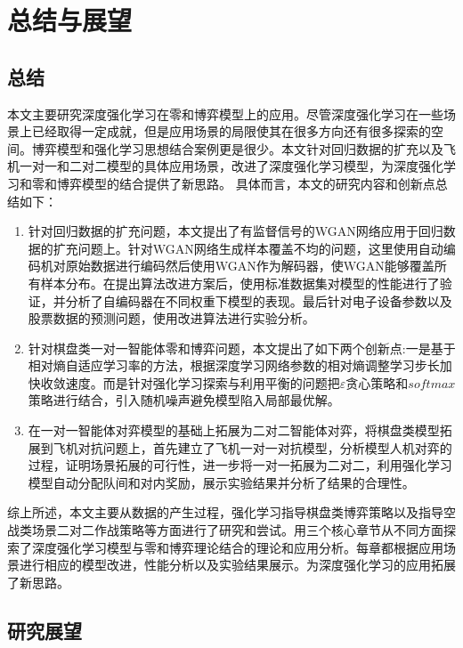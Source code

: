 \chapter{总结与展望}
\section{总结}
本文主要研究深度强化学习在零和博弈模型上的应用。尽管深度强化学习在一些场景上已经取得一定成就，但是应用场景的局限使其在很多方向还有很多探索的空间。博弈模型和强化学习思想结合案例更是很少。本文针对回归数据的扩充以及飞机一对一和二对二模型的具体应用场景，改进了深度强化学习模型，为深度强化学习和零和博弈模型的结合提供了新思路。
具体而言，本文的研究内容和创新点总结如下：
\begin{enumerate}
	\item  针对回归数据的扩充问题，本文提出了有监督信号的WGAN网络应用于回归数据的扩充问题上。针对WGAN网络生成样本覆盖不均的问题，这里使用自动编码机对原始数据进行编码然后使用WGAN作为解码器，使WGAN能够覆盖所有样本分布。在提出算法改进方案后，使用标准数据集对模型的性能进行了验证，并分析了自编码器在不同权重下模型的表现。最后针对电子设备参数以及股票数据的预测问题，使用改进算法进行实验分析。
	\item 针对棋盘类一对一智能体零和博弈问题，本文提出了如下两个创新点:一是基于相对熵自适应学习率的方法，根据深度学习网络参数的相对熵调整学习步长加快收敛速度。而是针对强化学习探索与利用平衡的问题把$\varepsilon$贪心策略和$softmax$策略进行结合，引入随机噪声避免模型陷入局部最优解。
	\item 在一对一智能体对弈模型的基础上拓展为二对二智能体对弈，将棋盘类模型拓展到飞机对抗问题上，首先建立了飞机一对一对抗模型，分析模型人机对弈的过程，证明场景拓展的可行性，进一步将一对一拓展为二对二，利用强化学习模型自动分配队间和对内奖励，展示实验结果并分析了结果的合理性。
\end{enumerate}

综上所述，本文主要从数据的产生过程，强化学习指导棋盘类博弈策略以及指导空战类场景二对二作战策略等方面进行了研究和尝试。用三个核心章节从不同方面探索了深度强化学习模型与零和博弈理论结合的理论和应用分析。每章都根据应用场景进行相应的模型改进，性能分析以及实验结果展示。为深度强化学习的应用拓展了新思路。

\section{研究展望}

